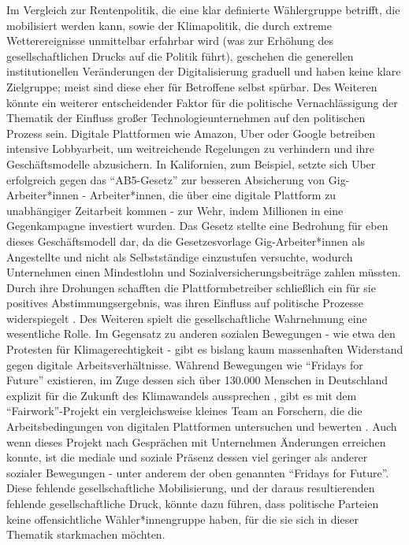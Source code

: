 \documentclass[12pt]{article}
\begin{document}
Im Vergleich zur Rentenpolitik, die eine klar definierte Wählergruppe betrifft, die mobilisiert werden kann, sowie der Klimapolitik, die durch extreme Wetterereignisse unmittelbar erfahrbar wird (was zur Erhöhung des gesellschaftlichen Drucks auf die Politik führt), geschehen die generellen institutionellen Veränderungen der Digitalisierung graduell und haben keine klare Zielgruppe; meist sind diese eher für Betroffene selbst spürbar. Des Weiteren könnte ein weiterer entscheidender Faktor für die politische Vernachlässigung der Thematik der Einfluss großer Technologieunternehmen auf den politischen Prozess sein. Digitale Plattformen wie Amazon, Uber oder Google betreiben intensive Lobbyarbeit, um weitreichende Regelungen zu verhindern und ihre Geschäftsmodelle abzusichern. In Kalifornien, zum Beispiel, setzte sich Uber erfolgreich gegen das \enquote{AB5-Gesetz} zur besseren Absicherung von Gig-Arbeiter*innen - Arbeiter*innen, die über eine digitale Plattform zu unabhängiger Zeitarbeit kommen \autocite[vgl.][]{bmz_faire_2025} - zur Wehr, indem Millionen in eine Gegenkampagne investiert wurden. Das Gesetz stellte eine Bedrohung für eben dieses Geschäftsmodell dar, da die Gesetzesvorlage Gig-Arbeiter*innen als Angestellte und nicht als Selbstständige einzustufen versuchte, wodurch Unternehmen einen Mindestlohn und Sozialversicherungsbeiträge zahlen müssten. Durch ihre Drohungen schafften die Plattformbetreiber schließlich ein für sie positives Abstimmungsergebnis, was ihren Einfluss auf politische Prozesse widerspiegelt \autocite[vgl.][]{wim_faber_uber_2020}. Des Weiteren spielt die gesellschaftliche Wahrnehmung eine wesentliche Rolle. Im Gegensatz zu anderen sozialen Bewegungen - wie etwa den Protesten für Klimagerechtigkeit - gibt es bislang kaum massenhaften Widerstand gegen digitale Arbeitsverhältnisse. Während Bewegungen wie \enquote{Fridays for Future} existieren, im Zuge dessen sich über 130.000 Menschen in Deutschland explizit für die Zukunft des Klimawandels aussprechen \autocite[vgl.][]{fridays_for_future_ampel_2025}, gibt es mit dem \enquote{Fairwork}-Projekt ein vergleichsweise kleines Team an Forschern, die die Arbeitsbedingungen von digitalen Plattformen untersuchen und bewerten \autocite[vgl.][]{fairwork_faq_2025}. Auch wenn dieses Projekt nach Gesprächen mit Unternehmen Änderungen erreichen konnte, ist die mediale und soziale Präsenz dessen viel geringer als anderer sozialer Bewegungen - unter anderem der oben genannten \enquote{Fridays for Future}. Diese fehlende gesellschaftliche Mobilisierung, und der daraus resultierenden fehlende gesellschaftliche Druck, könnte dazu führen, dass politische Parteien keine offensichtliche Wähler*innengruppe haben, für die sie sich in dieser Thematik starkmachen möchten.
\end{document}
